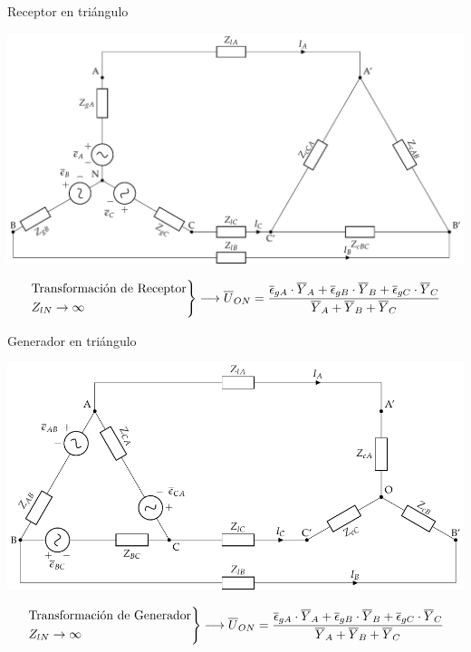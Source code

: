 \documentclass[aspectratio=169, usenames,svgnames,dvipsnames]{beamer}
\begin{document}
\begin{frame}[label={sec:org56f3c39}]{Receptor en triángulo}
\begin{center}
\includegraphics[height=0.7\textheight]{../figs/CircuitoTrifasicaGeneralizado_RT.pdf}
\end{center}
\[
  \begin{rcases}
    \text{Transformación de Receptor}\\
    Z_{lN} \to \infty
  \end{rcases}
  \longrightarrow \overline{U}_{ON} = \frac{\overline{\epsilon}_{gA} \cdot \overline{Y}_A + \overline{\epsilon}_{gB} \cdot \overline{Y}_B + \overline{\epsilon}_{gC} \cdot \overline{Y}_C}{\overline{Y}_A + \overline{Y}_B + \overline{Y}_C}
\]
\end{frame}



\begin{frame}[label={sec:org2c799a2}]{Generador en triángulo}
\begin{center}
\includegraphics[height=0.7\textheight]{../figs/CircuitoTrifasicaGeneralizado_GT.pdf}
\end{center}
\[
  \begin{rcases}
    \text{Transformación de Generador}\\
    Z_{lN} \to \infty
  \end{rcases}
  \longrightarrow \overline{U}_{ON} = \frac{\overline{\epsilon}_{gA} \cdot \overline{Y}_A + \overline{\epsilon}_{gB} \cdot \overline{Y}_B + \overline{\epsilon}_{gC} \cdot \overline{Y}_C}{\overline{Y}_A + \overline{Y}_B + \overline{Y}_C}
\]
\end{frame}
\end{document}
